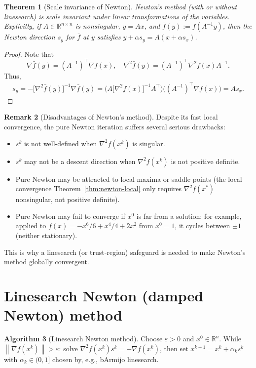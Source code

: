 \documentclass[11pt,a4paper]{report}
\theoremstyle{plain}
\newtheorem{theorem}{Theorem}[chapter]
\theoremstyle{definition}
\newtheorem{remark}[theorem]{Remark}
\newtheorem{algorithm}[theorem]{Algorithm}
\newcommand{\R}{\mathbb{R}}
\newcommand{\norm}[1]{\left\lVert#1\right\rVert}
\newcommand{\grad}{\nabla}
\newcommand{\hess}{\nabla^{2}}
\newcommand{\trans}{^{\top}}
\newcommand{\eps}{\varepsilon}
\begin{document}
\begin{theorem}[Scale invariance of Newton]\label{thm:newton-scale}
Newton's method (with or without linesearch) is scale invariant under linear
transformations of the variables. Explicitly, if $A\in\R^{n\times n}$ is
nonsingular, $y=Ax$, and $\bar f(y):=f(A^{-1}y)$, then the Newton direction $s_{y}$
for $\bar f$ at $y$ satisfies $y+\alpha s_{y}=A(x+\alpha s_{x})$.
\end{theorem}

\begin{proof}
  Note that
  \[
    \grad \bar f(y) = (A^{-1})\trans \grad f(x), \quad \hess \bar f(y) = (A^{-1})\trans \hess f(x) A^{-1}.
  \]
  Thus,
  \begin{align*}
    s_y = -\bigl[\hess \bar f(y)\bigr]^{-1} \grad \bar f(y) = \bigl(A \bigl[\hess f(x)\bigr]^{-1} A\trans\bigr) \bigl((A^{-1})\trans \grad f(x)\bigr) = A s_x.
  \end{align*}
\end{proof}

\begin{remark}[Disadvantages of Newton's method]
Despite its fast local convergence, the pure Newton iteration suffers several
serious drawbacks:
\begin{itemize}[leftmargin=2em,itemsep=0pt]
  \item $s^{k}$ is not well-defined when $\hess f(x^{k})$ is singular.
  \item $s^{k}$ may not be a descent direction when $\hess f(x^{k})$ is not
        positive definite.
  \item Pure Newton may be attracted to local maxima or saddle points (the local
        convergence Theorem~\ref{thm:newton-local} only requires $\hess f(x^{*})$
        nonsingular, not positive definite).
  \item Pure Newton may fail to converge if $x^{0}$ is far from a solution; for
        example, applied to $f(x)=-x^{6}/6+x^{4}/4+2x^{2}$ from $x^{0}=1$, it
        cycles between $\pm 1$ (neither stationary).
\end{itemize}
This is why a linesearch (or trust-region) safeguard is needed to make Newton's
method globally convergent.
\end{remark}

\section{Linesearch Newton (damped Newton) method}

\begin{algorithm}[Linesearch Newton method]
Choose $\eps>0$ and $x^{0}\in\R^{n}$. While $\norm{\grad f(x^{k})}>\eps$:
solve $\hess f(x^{k})s^{k}=-\grad f(x^{k})$, then set $x^{k+1}=x^{k}+\alpha_{k}s^{k}$
with $\alpha_{k}\in(0,1]$ chosen by, e.g., bArmijo linesearch.
\end{algorithm}
\end{document}
